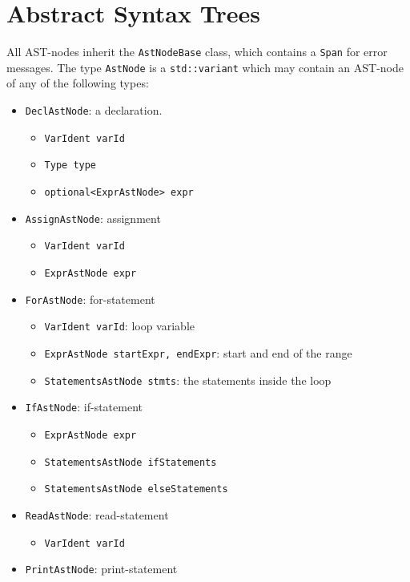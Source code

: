 \documentclass[a4paper]{article}
\newcommand*{\code}[1]{\texttt{#1}}
\begin{document}
\clearpage
\section{Abstract Syntax Trees}

All AST-nodes inherit the \code{AstNodeBase} class, which contains 
a \code{Span} for error messages. The type \code{AstNode} is a 
\code{std::variant} which may contain an AST-node of any of the 
following types:

\begin{itemize}
  \item \code{DeclAstNode}: a declaration.
  \begin{itemize}
    \item[] \code{VarIdent varId}
    \item[] \code{Type type} 
    \item[] \code{optional<ExprAstNode> expr}
  \end{itemize}
  \item \code{AssignAstNode}: assignment
  \begin{itemize}
    \item[] \code{VarIdent varId}
    \item[] \code{ExprAstNode expr}
  \end{itemize}
  \item \code{ForAstNode}: for-statement
  \begin{itemize}
    \item[] \code{VarIdent varId}: loop variable
    \item[] \code{ExprAstNode startExpr, endExpr}: start and end of the range
    \item[] \code{StatementsAstNode stmts}: the statements inside the loop
  \end{itemize}
  \item \code{IfAstNode}: if-statement
  \begin{itemize}
    \item[] \code{ExprAstNode expr}
    \item[] \code{StatementsAstNode ifStatements}
    \item[] \code{StatementsAstNode elseStatements}
  \end{itemize}
  \item \code{ReadAstNode}: read-statement
  \begin{itemize}
    \item[] \code{VarIdent varId}
  \end{itemize}
  \item \code{PrintAstNode}: print-statement

\end{itemize}
\end{document}
